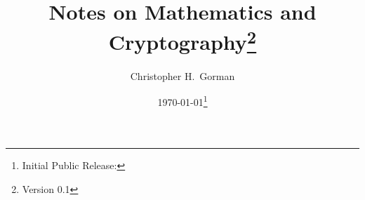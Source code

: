 
\newcommand*{\Author}[0]{Christopher H.~Gorman}
\newcommand*{\Title}[0]{Notes on Mathematics and Cryptography}






\author{\Author{}}
\title{\Title{}\thanks{Version 0.1}}
\date{\today\thanks{Initial Public Release: }}


